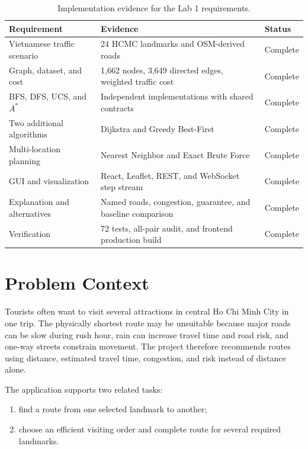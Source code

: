 \documentclass[12pt,a4paper]{article}
\begin{document}
\begin{table}[H]
    \centering
    \caption{Implementation evidence for the Lab 1 requirements.}
    \label{tab:completion}
    \renewcommand{\arraystretch}{1.15}
    \small
    \begin{tabularx}{\textwidth}{P{4.2cm} Y P{2cm}}
        \toprule
        \textbf{Requirement} & \textbf{Evidence} & \textbf{Status} \\
        \midrule
        Vietnamese traffic scenario & 24 HCMC landmarks and OSM-derived roads & Complete \\
        Graph, dataset, and cost & 1,662 nodes, 3,649 directed edges, weighted traffic cost & Complete \\
        BFS, DFS, UCS, and $A^*$ & Independent implementations with shared contracts & Complete \\
        Two additional algorithms & Dijkstra and Greedy Best-First & Complete \\
        Multi-location planning & Nearest Neighbor and Exact Brute Force & Complete \\
        GUI and visualization & React, Leaflet, REST, and WebSocket step stream & Complete \\
        Explanation and alternatives & Named roads, congestion, guarantee, and baseline comparison & Complete \\
        Verification & 72 tests, all-pair audit, and frontend production build & Complete \\
        \bottomrule
    \end{tabularx}
\end{table}

\section{Problem Context}

Tourists often want to visit several attractions in central Ho Chi Minh City
in one trip. The physically shortest route may be unsuitable because major
roads can be slow during rush hour, rain can increase travel time and road
risk, and one-way streets constrain movement. The project therefore recommends
routes using distance, estimated travel time, congestion, and risk instead of
distance alone.

The application supports two related tasks:

\begin{enumerate}
    \item find a route from one selected landmark to another;
    \item choose an efficient visiting order and complete route for several
          required landmarks.
\end{enumerate}
\end{document}
